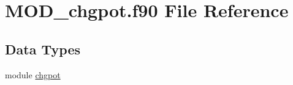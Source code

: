 \hypertarget{MOD__chgpot_8f90}{\section{M\-O\-D\-\_\-chgpot.\-f90 File Reference}
\label{MOD__chgpot_8f90}
}
\subsection*{Data Types}
\begin{DoxyCompactItemize}
\item 
module \hyperlink{classchgpot}{chgpot}
\end{DoxyCompactItemize}
